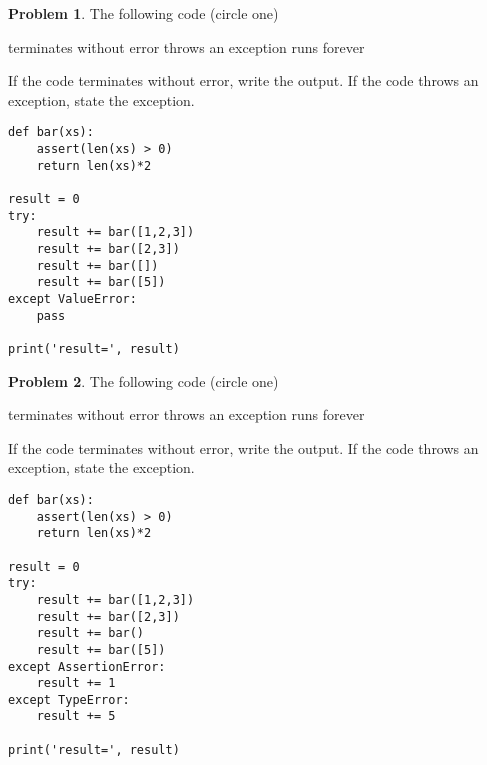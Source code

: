\documentclass[10pt]{article}
\theoremstyle{definition}
\newtheorem{problem}{Problem}
\begin{document}
\newpage
\begin{problem}
    The following code (circle one)

    \vspace{0.25in}
    \hspace{0.5in}terminates without error 
    \hspace{1in}throws an exception
    \hspace{1in}runs forever
    \vspace{0.25in}

    \noindent
    If the code terminates without error, write the output.
    If the code throws an exception, state the exception.
\end{problem}
\begin{lstlisting}
def bar(xs):
    assert(len(xs) > 0)
    return len(xs)*2

result = 0
try:
    result += bar([1,2,3])
    result += bar([2,3])
    result += bar([])
    result += bar([5])
except ValueError:
    pass

print('result=', result)
\end{lstlisting}
\vspace{0.75in}

\begin{problem}
    The following code (circle one)

    \vspace{0.25in}
    \hspace{0.5in}terminates without error 
    \hspace{1in}throws an exception
    \hspace{1in}runs forever
    \vspace{0.25in}

    \noindent
    If the code terminates without error, write the output.
    If the code throws an exception, state the exception.
\end{problem}
\begin{lstlisting}
def bar(xs):
    assert(len(xs) > 0)
    return len(xs)*2

result = 0
try:
    result += bar([1,2,3])
    result += bar([2,3])
    result += bar()
    result += bar([5])
except AssertionError:
    result += 1
except TypeError:
    result += 5

print('result=', result)
\end{lstlisting}
\vspace{0.75in}
\end{document}

